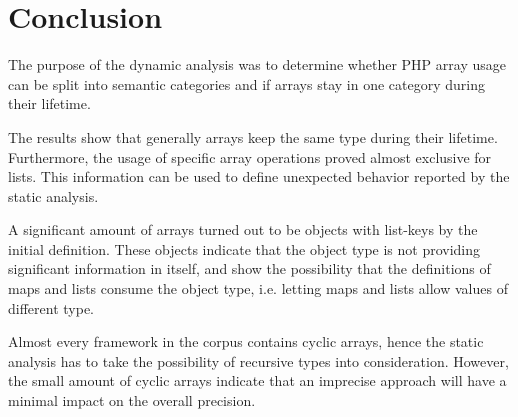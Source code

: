 \section{Conclusion}
\label{sec:studyConclusion}
The purpose of the dynamic analysis was to determine whether PHP array usage can be split into semantic categories and if arrays stay in one category during their lifetime. 

The results show that generally arrays keep the same type during their lifetime. Furthermore, the usage of specific array operations proved almost exclusive for lists. This information can be used to define unexpected behavior reported by the static analysis.

A significant amount of arrays turned out to be objects with list-keys by the initial definition. These objects indicate that the object type is not providing significant information in itself, and show the possibility that the definitions of maps and lists consume the object type, i.e. letting maps and lists allow values of different type.

Almost every framework in the corpus contains cyclic arrays, hence the static analysis has to take the possibility of recursive types into consideration. However, the small amount of cyclic arrays indicate that an imprecise approach will have a minimal impact on the overall precision.